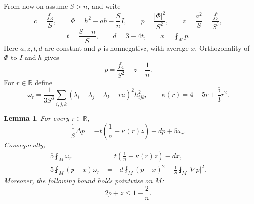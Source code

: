 \documentclass[11pt,reqno]{amsart}
\numberwithin{equation}{section}
\newtheorem{lemma}[theorem]{Lemma}
\newcommand{\norm}[1]{\lvert #1\rvert}
\begin{document}
From now on assume $S>n$, and write
\begin{equation}\label{eq:basic-variables}
a=\frac{f_3}{S},\qquad
\Phi=h^2-ah-\frac Sn I,
\qquad
p=\frac{\norm\Phi^2}{S^2},
\qquad
z=\frac{a^2}{S}=\frac{f_3^2}{S^3},
\end{equation}
\[
t=\frac{S-n}{S},\qquad d=3-4t,
\qquad x=\fint_Mp.
\]
Here $a,z,t,d$ are constant and $p$ is nonnegative, with average $x$. Orthogonality of $\Phi$ to $I$ and $h$ gives
\begin{equation}\label{eq:p-formula}
p=\frac{f_4}{S^2}-z-\frac1n.
\end{equation}
For $r\in\mathbb R$ define
\begin{equation}\label{eq:omega-r}
\omega_r=
\frac1{3S^3}\sum_{i,j,k}
\left(\lambda_i+\lambda_j+\lambda_k-ra\right)^2h_{ijk}^2,
\qquad
\kappa(r)=4-5r+\frac53r^2.
\end{equation}

\begin{lemma}\label{lem:scalar}
For every $r\in\mathbb R$,
\begin{equation}\label{eq:scalar-defect}
\frac1S\Delta p
=-t\left(\frac1n+\kappa(r)z\right)+dp+5\omega_r.
\end{equation}
Consequently,
\begin{align}
5\fint_M\omega_r
&=t\left(\frac1n+\kappa(r)z\right)-dx,\label{eq:omega-average}\\
5\fint_M(p-x)\omega_r
&=-d\fint_M(p-x)^2-\frac1S\fint_M\norm{\nabla p}^2.
\label{eq:omega-cov}
\end{align}
Moreover, the following bound holds pointwise on $M$:
\begin{equation}\label{eq:moment-region}
2p+z\le1-\frac2n.
\end{equation}
\end{lemma}
\end{document}
